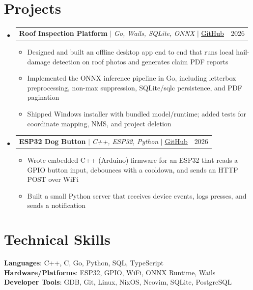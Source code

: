 \documentclass[letterpaper,11pt]{article}
\makeatletter
\newcommand{\resumeItem}[1]{
  \item\small{#1}
}
\newcommand{\resumeProjectHeading}[2]{
  \item
    \begin{tabular*}{0.97\textwidth}[t]{l@{\extracolsep{\fill}}r}
      \small#1 & #2 \\
    \end{tabular*}
}
\newcommand{\resumeSubHeadingListStart}{\begin{itemize}[leftmargin=0.15in, label={}, itemsep=8pt, parsep=0pt, topsep=2pt, partopsep=0pt]}
\newcommand{\resumeSubHeadingListEnd}{\end{itemize}}
\newcommand{\resumeItemListStart}{\begin{itemize}[leftmargin=0.15in, itemsep=3pt, parsep=0pt, topsep=3pt, partopsep=0pt]}
\newcommand{\resumeItemListEnd}{\end{itemize}}
\makeatother
\begin{document}
\section{Projects}
    \resumeSubHeadingListStart
      \resumeProjectHeading
          {\textbf{Roof Inspection Platform} $|$ \emph{Go, Wails, SQLite, ONNX} $|$ \href{https://github.com/dylandirosa98/roof-inspection-desktop-app}{\underline{GitHub}}}{2026}
          \resumeItemListStart
            \resumeItem{Designed and built an offline desktop app end to end that runs local hail-damage detection on roof photos and generates claim PDF reports}
            \resumeItem{Implemented the ONNX inference pipeline in Go, including letterbox preprocessing, non-max suppression, SQLite/sqlc persistence, and PDF pagination}
            \resumeItem{Shipped Windows installer with bundled model/runtime; added tests for coordinate mapping, NMS, and project deletion}
          \resumeItemListEnd
      \resumeProjectHeading
          {\textbf{ESP32 Dog Button} $|$ \emph{C++, ESP32, Python} $|$ \href{https://github.com/dylandirosa98/dog-button-python-server}{\underline{GitHub}}}{2026}
          \resumeItemListStart
            \resumeItem{Wrote embedded C++ (Arduino) firmware for an ESP32 that reads a GPIO button input, debounces with a cooldown, and sends an HTTP POST over WiFi}
            \resumeItem{Built a small Python server that receives device events, logs presses, and sends a notification}
          \resumeItemListEnd
    \resumeSubHeadingListEnd

\section{Technical Skills}
  \begin{itemize}[leftmargin=0.15in, label={}, itemsep=2pt, parsep=0pt, topsep=0pt, partopsep=0pt]
    \small{\item{
     \textbf{Languages}{: C++, C, Go, Python, SQL, TypeScript} \\[3pt]
     \textbf{Hardware/Platforms}{: ESP32, GPIO, WiFi, ONNX Runtime, Wails} \\[3pt]
     \textbf{Developer Tools}{: GDB, Git, Linux, NixOS, Neovim, SQLite, PostgreSQL}
    }}
  \end{itemize}
\end{document}
